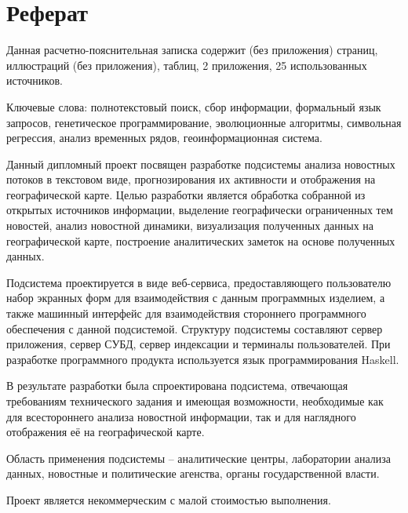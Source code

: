 \section*{Реферат}

Данная расчетно-пояснительная записка содержит \pageref{preLastPage} (без приложения) страниц,  иллюстраций (без приложения),  таблиц, 2 приложения, 25 использованных источников.

Ключевые слова: полнотекстовый поиск, сбор информации, формальный язык запросов, генетическое программирование, эволюционные алгоритмы, символьная регрессия, анализ временных рядов, геоинформационная система.

Данный дипломный проект посвящен разработке подсистемы анализа новостных потоков в текстовом виде, прогнозирования их активности и отображения на географической карте. Целью разработки является обработка собранной из открытых источников информации, выделение географически ограниченных тем новостей, анализ новостной динамики, визуализация полученных данных на географической карте, построение аналитических заметок на основе полученных данных.

Подсистема проектируется в виде веб-сервиса, предоставляющего пользователю набор экранных форм для взаимодействия с данным программных изделием, а также машинный интерфейс для взаимодействия стороннего программного обеспечения с данной подсистемой. Структуру подсистемы составляют сервер приложения, сервер СУБД, сервер индексации и терминалы пользователей. При разработке программного продукта используется язык программирования Haskell.

В результате разработки была спроектирована подсистема, отвечающая требованиям технического задания и имеющая возможности, необходимые как для всестороннего анализа новостной информации, так и для наглядного отображения её на географической карте. 

Область применения подсистемы -- аналитические центры, лаборатории анализа данных, новостные и политические агенства, органы государственной власти.

Проект является некоммерческим с малой стоимостью выполнения.